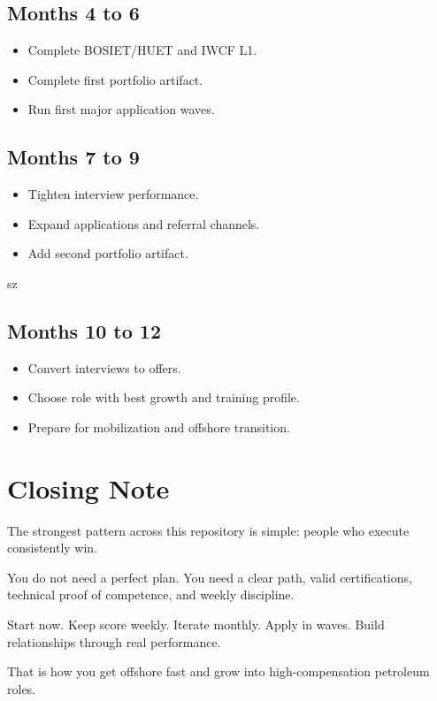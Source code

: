 \documentclass[11pt,openany]{book}
\begin{document}
\section{Months 4 to 6}
\begin{itemize}
  \item Complete BOSIET/HUET and IWCF L1.
  \item Complete first portfolio artifact.
  \item Run first major application waves.
\end{itemize}

\section{Months 7 to 9}
\begin{itemize}
  \item Tighten interview performance.
  \item Expand applications and referral channels.
  \item Add second portfolio artifact.
\end{itemize}
sz
\section{Months 10 to 12}
\begin{itemize}
  \item Convert interviews to offers.
  \item Choose role with best growth and training profile.
  \item Prepare for mobilization and offshore transition.
\end{itemize}

\backmatter

\chapter*{Closing Note}
The strongest pattern across this repository is simple: people who execute consistently win.

You do not need a perfect plan. You need a clear path, valid certifications, technical proof of competence, and weekly discipline.

Start now. Keep score weekly. Iterate monthly. Apply in waves. Build relationships through real performance.

That is how you get offshore fast and grow into high-compensation petroleum roles.
 
\end{document}
